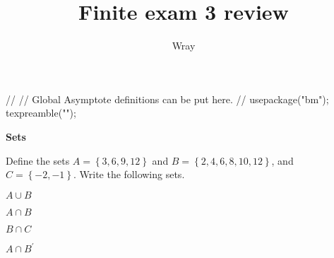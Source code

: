 \documentclass[12pt]{exam}
\title{Finite exam 3 review}
\author{Wray}
\begin{document}
\begin{asydef}
//
// Global Asymptote definitions can be put here.
//
usepackage("bm");
texpreamble("\def\V#1{\bm{#1}}");
\end{asydef}

\bigskip
\bigskip

\textbf{Sets}
\bigskip

Define the sets $A = \left\lbrace 3, 6, 9 ,12 \right\rbrace$ and 
$B = \left\lbrace 2, 4, 6, 8, 10, 12 \right\rbrace$, and $C = \left\lbrace -2, -1 \right\rbrace$.  Write the following sets.

\begin{questions}

\question
$A \cup B$

\question
$A \cap B$

\question
$B \cap C$

\question
$A \cap B^{\prime}$

\end{questions}
\end{document}
